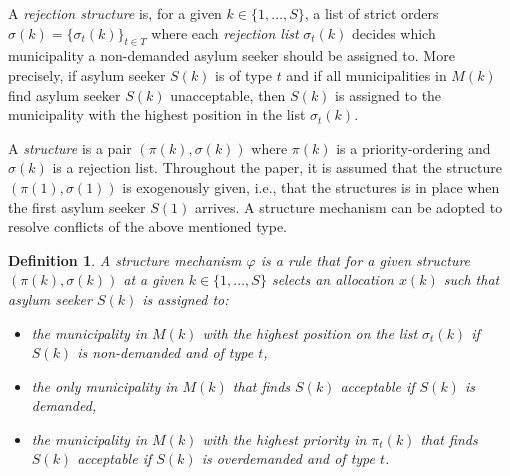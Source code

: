 \documentclass[12pt,fleqn]{article}
\newtheorem{definition}{Definition}
\begin{document}
A \emph{rejection structure} is, for a given $k\in\{1,\ldots,S\}$, a list of strict orders $\sigma(k)=\{\sigma_t(k)\}_{t\in T}$ where each \emph{rejection list} $\sigma_t(k)$ decides which municipality a non-demanded asylum seeker should be assigned to. More precisely, if asylum seeker $S(k)$ is of type $t$ and if all municipalities in $M(k)$ find asylum seeker $S(k)$ unacceptable, then $S(k)$ is assigned to the municipality with the highest position in the list $\sigma_t(k)$.

A \emph{structure} is a pair $(\pi(k),\sigma(k))$ where $\pi(k)$ is a priority-ordering and $\sigma(k)$ is a rejection list. Throughout the paper, it is assumed that the structure $(\pi(1),\sigma(1))$ is exogenously given, i.e., that the structures is in place when the first asylum seeker $S(1)$ arrives. A structure mechanism can be adopted to resolve conflicts of the above mentioned type.
\begin{definition}\rm\label{DEF:Structure_Mechanism}
A structure mechanism $\varphi$ is a rule that for a given structure $(\pi(k),\sigma(k))$ at a given $k\in\{1,\ldots,S\}$ selects an allocation $x(k)$ such that asylum seeker $S(k)$ is assigned to:
\begin{itemize}
\item[(i)] the municipality in $M(k)$ with the highest position on the list $\sigma_t(k)$ if $S(k)$ is non-demanded and of type $t$,
\item[(ii)] the only municipality in $M(k)$ that finds $S(k)$ acceptable if $S(k)$ is demanded,
\item[(iii)] the municipality in $M(k)$ with the highest priority in $\pi_t(k)$ that finds $S(k)$ acceptable if $S(k)$ is overdemanded and of type $t$.
\end{itemize}
\end{definition}
\end{document}
